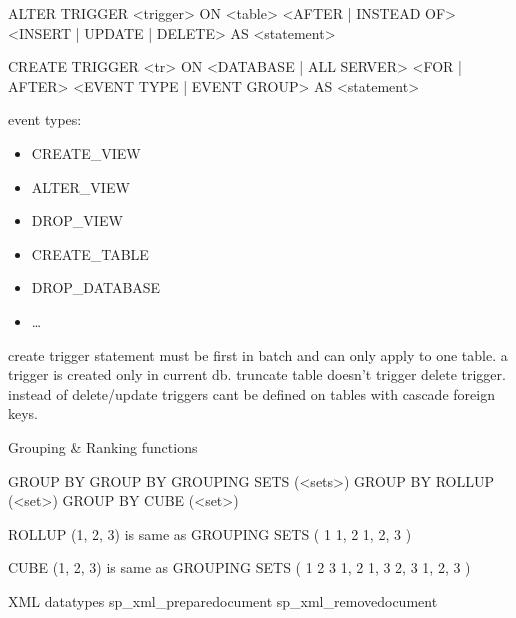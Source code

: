 \documentclass{article}
\begin{document}
    ALTER TRIGGER <trigger>
        ON <table>
        <AFTER | INSTEAD OF> <INSERT | UPDATE | DELETE>
    AS <statement>

    CREATE TRIGGER <tr>
    ON <DATABASE | ALL SERVER>
    <FOR | AFTER> <EVENT TYPE | EVENT GROUP>
    AS <statement>

    event types:
    \begin{itemize}
        \item CREATE_VIEW
        \item ALTER_VIEW
        \item DROP_VIEW
        \item CREATE_TABLE
        \item DROP_DATABASE
        \item \dots
    \end{itemize}

    create trigger statement must be first in batch and can only apply to one table.
    a trigger is created only in current db.
    truncate table doesn't trigger delete trigger.
    instead of delete/update triggers cant be defined on tables with cascade foreign keys.

    Grouping & Ranking functions

    GROUP BY
    GROUP BY GROUPING SETS (<sets>)
    GROUP BY ROLLUP (<set>)
    GROUP BY CUBE (<set>)

    ROLLUP (1, 2, 3) is same as GROUPING SETS (
        1 
        1, 2
        1, 2, 3
    )

    CUBE (1, 2, 3) is same as GROUPING SETS (
        1
        2
        3
        1, 2
        1, 3
        2, 3
        1, 2, 3
    )

    XML datatypes
    sp_xml_preparedocument
    sp_xml_removedocument
\end{document}
